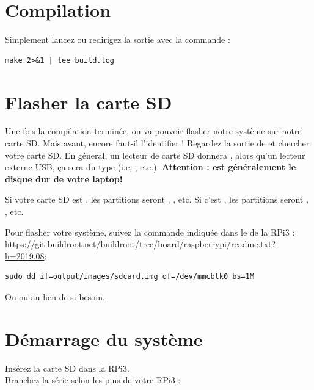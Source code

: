 \section{Compilation}

Simplement lancez  ou redirigez la sortie avec la commande
:

\begin{verbatim}
make 2>&1 | tee build.log
\end{verbatim}

\section{Flasher la carte SD}

Une fois la compilation terminée, on va pouvoir flasher notre système
sur notre carte SD. Mais avant, encore faut-il l'identifier !
Regardez la sortie de  et
chercher votre carte SD. En géneral, un lecteur de carte SD donnera
, alors qu'un lecteur externe USB, ça sera du type
 (i.e, , etc.). {\bf Attention :
   est généralement le disque dur de votre laptop!}

Si votre carte SD est , les partitions seront
, , etc. Si c'est ,
les partitions seront , , etc.

Pour flasher votre système, suivez la commande indiquée dans le 
de la RPi3 : \url{https://git.buildroot.net/buildroot/tree/board/raspberrypi/readme.txt?h=2019.08}: \\

\begin{verbatim}
sudo dd if=output/images/sdcard.img of=/dev/mmcblk0 bs=1M
\end{verbatim}

Ou  ou  au lieu de  si besoin.

\section{Démarrage du système}

Insérez la carte SD dans la RPi3.\\
Branchez la série selon les pins de votre RPi3 :

